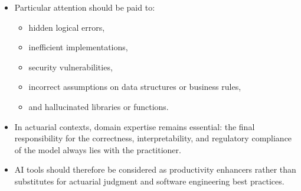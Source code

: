 \documentclass[
  ignorenonframetext,
]{beamer}
\providecommand{\tightlist}{%
  \setlength{\itemsep}{0pt}\setlength{\parskip}{0pt}}
\begin{document}
\begin{frame}
\begin{itemize}
\tightlist
\item
  Particular attention should be paid to:

  \begin{itemize}
  \tightlist
  \item
    hidden logical errors,
  \item
    inefficient implementations,
  \item
    security vulnerabilities,
  \item
    incorrect assumptions on data structures or business rules,
  \item
    and hallucinated libraries or functions.
  \end{itemize}
\item
  In actuarial contexts, domain expertise remains essential: the final
  responsibility for the correctness, interpretability, and regulatory
  compliance of the model always lies with the practitioner.
\item
  AI tools should therefore be considered as productivity enhancers
  rather than substitutes for actuarial judgment and software
  engineering best practices.
\end{itemize}
\end{frame}
\end{document}
